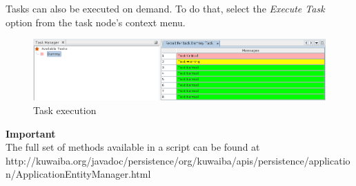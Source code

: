 \documentclass[a4paper]{article}
\begin{document}
		Tasks can also be executed on demand. To do that, select the \textit{Execute Task} option from the task node's context menu.
		\begin{figure}[h!]
			\centering
			\includegraphics[width=1.1\linewidth]{img/task_manager_execute_task.png}
			\caption{Task execution}
			\label{fig:task_manager_execute_task}
		\end{figure}
		\begin{framed} {\large \textbf{Important}}\\
			The full set of methods available in a script can be found at \\ \tiny{http://kuwaiba.org/javadoc/persistence/org/kuwaiba/apis/persistence/application/ApplicationEntityManager.html}
		\end{framed}
		
	\clearpage
\end{document}

